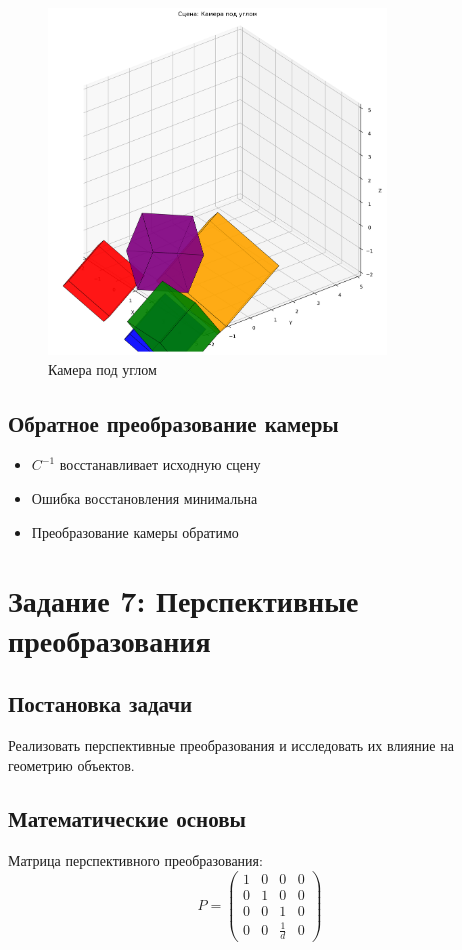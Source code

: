 \begin{figure}[H]
\centering
\includegraphics[width=0.8\textwidth]{images/task6/camera_angle.png}
\caption{Камера под углом}
\end{figure}

\subsection*{Обратное преобразование камеры}
\begin{itemize}
    \item $C^{-1}$ восстанавливает исходную сцену
    \item Ошибка восстановления минимальна
    \item Преобразование камеры обратимо
\end{itemize}

\section*{Задание 7: Перспективные преобразования}

\subsection*{Постановка задачи}
Реализовать перспективные преобразования и исследовать их влияние на геометрию объектов.

\subsection*{Математические основы}
Матрица перспективного преобразования:
\begin{equation}
P = \begin{pmatrix}
1 & 0 & 0 & 0 \\
0 & 1 & 0 & 0 \\
0 & 0 & 1 & 0 \\
0 & 0 & \frac{1}{d} & 0
\end{pmatrix}
\end{equation}

